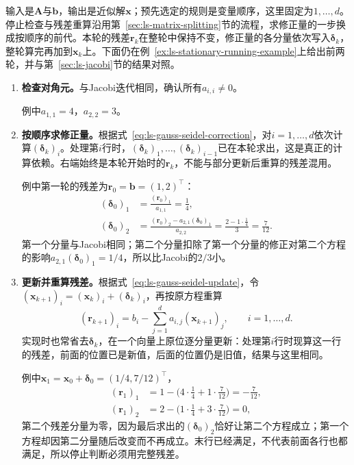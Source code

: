 输入是$\bm A$与$\bm b$，输出是近似解$\bm x$；预先选定的规则是变量顺序，这里固定为$1,\ldots,d$。停止检查与残差重算沿用第~\ref{sec:ls-matrix-splitting}节的流程，求修正量的一步换成按顺序的前代。本轮的残差$\bm r_k$在整轮中保持不变，修正量的各分量依次写入$\bm\delta_k$，整轮算完再加到$\bm x_k$上。下面仍在例~\ref{ex:ls-stationary-running-example}上给出前两轮，并与第~\ref{sec:ls-jacobi}节的结果对照。
\begin{enumerate}
 \item \textbf{检查对角元。}与Jacobi迭代相同，确认所有$a_{i,i}\neq0$。

 例中$a_{1,1}=4$，$a_{2,2}=3$。

 \item \textbf{按顺序求修正量。}根据式~\eqref{eq:ls-gauss-seidel-correction}，对$i=1,\ldots,d$依次计算$(\bm\delta_k)_i$。处理第$i$行时，$(\bm\delta_k)_1,\ldots,(\bm\delta_k)_{i-1}$已在本轮求出，这是真正的计算依赖。右端始终是本轮开始时的$\bm r_k$，不能与部分更新后重算的残差混用。

 例中第一轮的残差为$\bm r_0=\bm b=(1,2)^\top$：
 \[
  \begin{aligned}
  (\bm\delta_0)_1&=\frac{(\bm r_0)_1}{a_{1,1}}=\frac14,\\
  (\bm\delta_0)_2&=\frac{(\bm r_0)_2-a_{2,1}(\bm\delta_0)_1}{a_{2,2}}=\frac{2-1\cdot\tfrac14}{3}=\frac7{12} .
  \end{aligned}
 \]
 第一个分量与Jacobi相同；第二个分量扣除了第一个分量的修正对第二个方程的影响$a_{2,1}(\bm\delta_0)_1=1/4$，所以比Jacobi的$2/3$小。

 \item \textbf{更新并重算残差。}根据式~\eqref{eq:ls-gauss-seidel-update}，令$(\bm x_{k+1})_i=(\bm x_k)_i+(\bm\delta_k)_i$，再按原方程重算
 \[
  (\bm r_{k+1})_i=b_i-\sum_{j=1}^d a_{i,j}(\bm x_{k+1})_j ,\qquad i=1,\ldots,d .
 \]
 实现时也常省去$\bm\delta_k$，在一个向量上原位逐分量更新：处理第$i$行时现算这一行的残差，前面的位置已是新值，后面的位置仍是旧值，结果与这里相同。

 例中$\bm x_1=\bm x_0+\bm\delta_0=(1/4,7/12)^\top$，
 \[
  \begin{aligned}
  (\bm r_1)_1&=1-\bigl(4\cdot\tfrac14+1\cdot\tfrac7{12}\bigr)=-\tfrac7{12},\\
  (\bm r_1)_2&=2-\bigl(1\cdot\tfrac14+3\cdot\tfrac7{12}\bigr)=0 ,
  \end{aligned}
 \]
 第二个残差分量为零，因为最后求出的$(\bm\delta_0)_2$恰好让第二个方程成立；第一个方程却因第二分量随后改变而不再成立。末行已经满足，不代表前面各行也都满足，所以停止判断必须用完整残差。


\end{enumerate}
